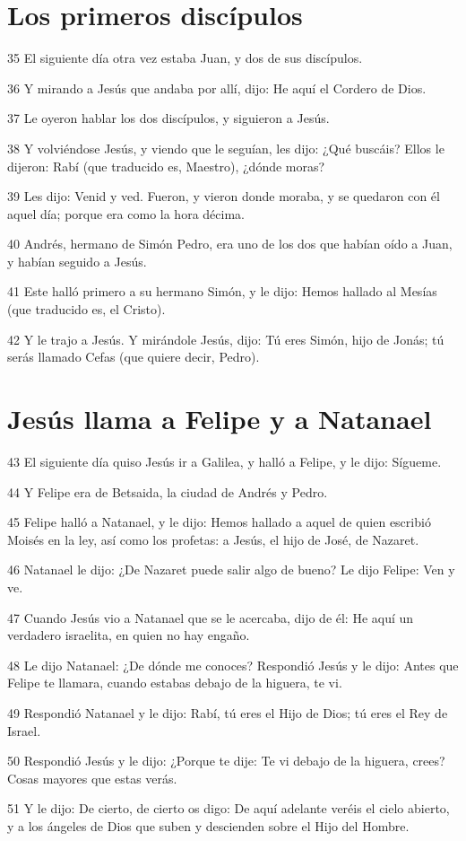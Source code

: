 \section*{Los primeros discípulos}

\par 35 El siguiente día otra vez estaba Juan, y dos de sus discípulos.
\par 36 Y mirando a Jesús que andaba por allí, dijo: He aquí el Cordero de Dios.
\par 37 Le oyeron hablar los dos discípulos, y siguieron a Jesús.
\par 38 Y volviéndose Jesús, y viendo que le seguían, les dijo: ¿Qué buscáis? Ellos le dijeron: Rabí (que traducido es, Maestro), ¿dónde moras?
\par 39 Les dijo: Venid y ved. Fueron, y vieron donde moraba, y se quedaron con él aquel día; porque era como la hora décima.
\par 40 Andrés, hermano de Simón Pedro, era uno de los dos que habían oído a Juan, y habían seguido a Jesús.
\par 41 Este halló primero a su hermano Simón, y le dijo: Hemos hallado al Mesías (que traducido es, el Cristo).
\par 42 Y le trajo a Jesús. Y mirándole Jesús, dijo: Tú eres Simón, hijo de Jonás; tú serás llamado Cefas (que quiere decir, Pedro).

\section*{Jesús llama a Felipe y a Natanael}

\par 43 El siguiente día quiso Jesús ir a Galilea, y halló a Felipe, y le dijo: Sígueme.
\par 44 Y Felipe era de Betsaida, la ciudad de Andrés y Pedro.
\par 45 Felipe halló a Natanael, y le dijo: Hemos hallado a aquel de quien escribió Moisés en la ley, así como los profetas: a Jesús, el hijo de José, de Nazaret.
\par 46 Natanael le dijo: ¿De Nazaret puede salir algo de bueno? Le dijo Felipe: Ven y ve.
\par 47 Cuando Jesús vio a Natanael que se le acercaba, dijo de él: He aquí un verdadero israelita, en quien no hay engaño.
\par 48 Le dijo Natanael: ¿De dónde me conoces? Respondió Jesús y le dijo: Antes que Felipe te llamara, cuando estabas debajo de la higuera, te vi.
\par 49 Respondió Natanael y le dijo: Rabí, tú eres el Hijo de Dios; tú eres el Rey de Israel.
\par 50 Respondió Jesús y le dijo: ¿Porque te dije: Te vi debajo de la higuera, crees? Cosas mayores que estas verás.
\par 51 Y le dijo: De cierto, de cierto os digo: De aquí adelante veréis el cielo abierto, y a los ángeles de Dios que suben y descienden sobre el Hijo del Hombre.

